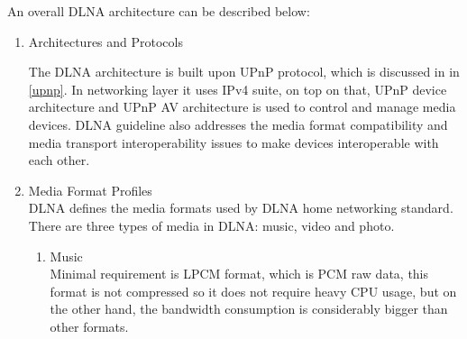 An overall DLNA architecture \cite{dlna_guideline} can be described below:
\begin{enumerate}
\item Architectures and Protocols

\begin{table}[htb]
\caption{Key Technology Ingredients \label{Table3}}
\begin{center}
\end{center}
\end{table}

The DLNA architecture is built upon UPnP protocol, which is discussed in
 in \ref{upnp}.
In networking layer it uses IPv4 suite, on top on that, UPnP device architecture
and UPnP AV architecture is used to control and manage media devices. DLNA
guideline also addresses the media format compatibility and media transport
interoperability issues to make devices interoperable with each other.

\item Media Format Profiles \\
DLNA defines the media formats used by DLNA home networking
standard. There are three types of media in DLNA: music, video and photo.
\begin{enumerate}
\item Music \\
Minimal requirement is LPCM format, which is PCM raw data, this format is not compressed so 
it does not require heavy CPU usage, but on the other hand, the bandwidth consumption is 
considerably bigger than other formats.


\end{enumerate}
\end{enumerate}
